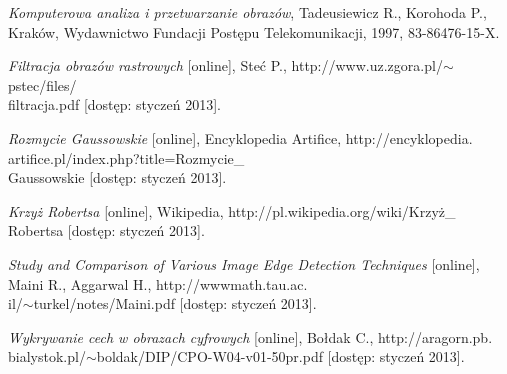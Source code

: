 \documentclass[a4paper,twocolumn,12pt]{article}
\begin{document}
\begin{thebibliography}{9}
 \small
 
  \emph{Komputerowa analiza i przetwarzanie obrazów},
  Tadeusiewicz R., Korohoda P.,
  Kraków,
  Wydawnictwo Fundacji Postępu Telekomunikacji,
  1997,
  83-86476-15-X.
 
  \emph{Filtracja obrazów rastrowych} [online],
  Steć P.,
  http://www.uz.zgora.pl/$\sim$pstec/files/\\filtracja.pdf [dostęp: styczeń 2013].
 
  \emph{Rozmycie Gaussowskie} [online],
  Encyklopedia Artifice,
  http://encyklopedia.\\artifice.pl/index.php?title=Rozmycie\_\\Gaussowskie [dostęp: styczeń 2013].
 
  \emph{Krzyż Robertsa} [online],
  Wikipedia,
  http://pl.wikipedia.org/wiki/Krzyż\_\\Robertsa [dostęp: styczeń 2013].
 
  \emph{Study and Comparison of Various Image Edge Detection Techniques} [online],
  Maini R., Aggarwal H.,
  http://wwwmath.tau.ac.\\il/$\sim$turkel/notes/Maini.pdf [dostęp: styczeń 2013].
 
  \emph{Wykrywanie cech w obrazach cyfrowych} [online],
  Bołdak C.,
  http://aragorn.pb.\\bialystok.pl/$\sim$boldak/DIP/CPO-W04-v01-50pr.pdf [dostęp: styczeń 2013].
  
\end{thebibliography}
\end{document}
